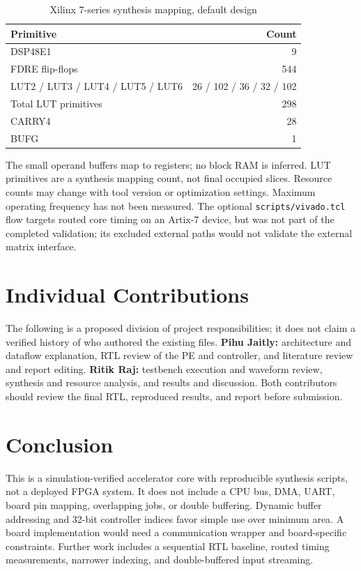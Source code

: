 \documentclass[conference]{IEEEtran}
\begin{document}
\begin{table}[t]
\caption{Xilinx 7-series synthesis mapping, default design}
\label{tab:resources}
\centering
\footnotesize
\begin{tabular}{@{}lr@{}}
\toprule
Primitive & Count \\
\midrule
DSP48E1 & 9 \\
FDRE flip-flops & 544 \\
LUT2 / LUT3 / LUT4 / LUT5 / LUT6 & 26 / 102 / 36 / 32 / 102 \\
Total LUT primitives & 298 \\
CARRY4 & 28 \\
BUFG & 1 \\
\bottomrule
\end{tabular}
\end{table}

The small operand buffers map to registers; no block RAM is inferred. LUT primitives are a synthesis mapping count, not final occupied slices. Resource counts may change with tool version or optimization settings. Maximum operating frequency has not been measured. The optional \texttt{scripts/vivado.tcl} flow targets routed core timing on an Artix-7 device, but was not part of the completed validation; its excluded external paths would not validate the external matrix interface.

\section{Individual Contributions}
The following is a proposed division of project responsibilities; it does not claim a verified history of who authored the existing files. \textbf{Pihu Jaitly:} architecture and dataflow explanation, RTL review of the PE and controller, and literature review and report editing. \textbf{Ritik Raj:} testbench execution and waveform review, synthesis and resource analysis, and results and discussion. Both contributors should review the final RTL, reproduced results, and report before submission.

\section{Conclusion}
This is a simulation-verified accelerator core with reproducible synthesis scripts, not a deployed FPGA system. It does not include a CPU bus, DMA, UART, board pin mapping, overlapping jobs, or double buffering. Dynamic buffer addressing and 32-bit controller indices favor simple use over minimum area. A board implementation would need a communication wrapper and board-specific constraints. Further work includes a sequential RTL baseline, routed timing measurements, narrower indexing, and double-buffered input streaming.
\end{document}
